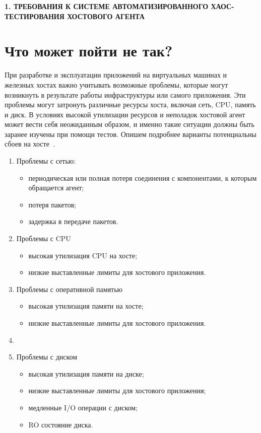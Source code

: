 \newpage
\begin{center}
  \textbf{\large 1. ТРЕБОВАНИЯ К СИСТЕМЕ АВТОМАТИЗИРОВАННОГО ХАОС-ТЕСТИРОВАНИЯ ХОСТОВОГО АГЕНТА}
\end{center}

\section{Что может пойти не так?}

При разработке и эксплуатации приложений на виртуальных машинах и железных хостах важно учитывать возможные проблемы,
которые могут возникнуть в результате работы инфраструктуры или самого приложения.
Эти проблемы могут затронуть различные ресурсы хоста, включая сеть, CPU, память и диск.
В условиях высокой утилизации ресурсов и неполадок хостовой агент может вести себя неожиданным образом,
и именно такие ситуации должны быть заранее изучены при помощи тестов.
Опишем подробнее варианты потенциальны сбоев на хосте~\cite{Blohowiak2016}.

\begin{enumerate}
  \item Проблемы с сетью:
  \begin{itemize}
    \item периодическая или полная потеря соединения с компонентами, к которым обращается агент;
    \item потеря пакетов;
    \item задержка в передаче пакетов.
  \end{itemize}
  \item Проблемы с CPU
  \begin{itemize}
    \item высокая утилизация CPU на хосте;
    \item низкие выставленные лимиты для хостового приложения.
  \end{itemize}
  \item Проблемы с оперативной памятью
  \begin{itemize}
    \item высокая утилизация памяти на хосте;
    \item низкие выставленные лимиты для хостового приложения.
  \end{itemize}
  \item \item Проблемы с диском
  \begin{itemize}
    \item высокая утилизация памяти на диске;
    \item низкие выставленные лимиты для хостового приложения;
    \item медленные I/O операции с диском;
    \item RO состояние диска.
  \end{itemize}
\end{enumerate}

